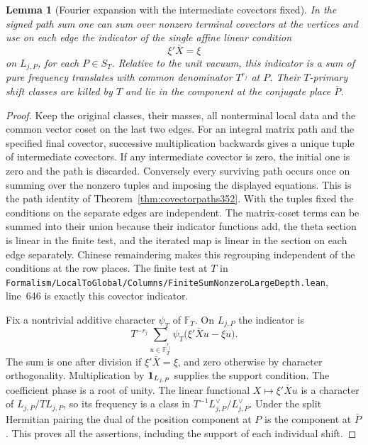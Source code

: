 \documentclass[a4paper,11pt]{article}
\newtheorem{lemma}[proposition]{Lemma}
\theoremstyle{definition}
\theoremstyle{remark}
\newcommand{\srcloc}[2]{{\small\nolinkurl{#1.lean}}, line~#2}
\numberwithin{equation}{section}
\begin{document}
\begin{lemma}[Fourier expansion with the intermediate covectors fixed]\leavevmode
\label{lem:terminalfourier454}
In the signed path sum one can sum over nonzero terminal
covectors at the vertices and use on each edge the indicator
of the single affine linear condition
\[
                       \xi' \bar X=\xi
\]
on \(L_{j,P}\), for each \(P\in S_T\). Relative to the unit
vacuum, this indicator is a sum of pure frequency translates
with common denominator \(T^{r_j}\) at \(P\). Their \(T\)-primary
shift classes are killed by \(T\) and lie in the component
at the conjugate place \(\bar P\).
\end{lemma}
\begin{proof}
Keep the original classes, their masses, all nonterminal local
data and the common vector coset on the last two edges.
For an integral matrix path and the specified final covector,
successive multiplication backwards gives a unique tuple of
intermediate covectors. If any intermediate covector is zero,
the initial one is zero and the path is discarded. Conversely
every surviving path occurs once on summing over the nonzero
tuples and imposing the displayed equations. This is the path
identity of Theorem~\ref{thm:covectorpaths352}. With the tuples
fixed the conditions on the separate edges are independent.
The matrix-coset terms can be summed into their union because
their indicator functions add, the theta section is linear in
the finite test, and the iterated map is linear in the section
on each edge separately. Chinese remaindering makes this
regrouping independent of the conditions at the row places.
The finite test at \(T\) in
\srcloc{Formalism/LocalToGlobal/Columns/FiniteSumNonzeroLargeDepth}{646}
is exactly this covector indicator.

Fix a nontrivial additive character \(\psi_T\) of \(\mathbb F_T\).
On \(L_{j,P}\) the indicator is
\[
  T^{-r_j}\sum_{u\in\mathbb F_T^{r_j}}
                 \psi_T\big(\xi'\bar X u-\xi u\big).
\]
The sum is one after division if \(\xi'\bar X=\xi\), and zero
otherwise by character orthogonality. Multiplication by
\({\bf1}_{L_{j,P}}\) supplies the support condition. The
coefficient phase is a root of unity. The linear functional
\(X\mapsto\xi'\bar X u\) is a character of \(L_{j,P}/T L_{j,P}\),
so its frequency is a class in \(T^{-1}L_{j,P}^\vee/L_{j,P}^\vee\).
Under the split Hermitian pairing the dual of the position
component at \(P\) is the component at \(\bar P\). This proves
all the assertions, including the support of each individual
shift.
\end{proof}
\end{document}

